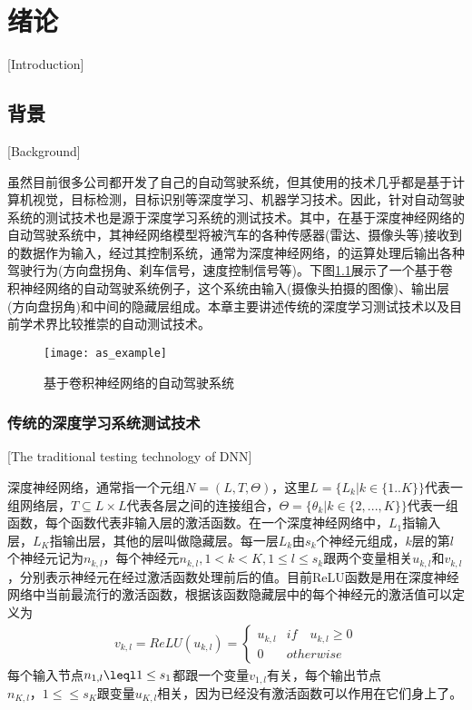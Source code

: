 \newcommand{\specialcell}[2][c]{%
  \begin{tabular}[#1]{@{}c@{}}#2\end{tabular}}
\newcommand{\mthead}[1]{\textit{\textbf{#1}}}

\newcommand{\newmodel}[1]{\textbf{#1.}\cite{#1}\quad}

\chapter{绪论}[Introduction]

\section{背景}[Background]

虽然目前很多公司都开发了自己的自动驾驶系统，但其使用的技术几乎都是基于计算机视觉，目标检测，目标识别等深度学习、机器学习技术。因此，针对自动驾驶系统的测试技术也是源于深度学习系统的测试技术。其中，在基于深度神经网络的自动驾驶系统中，其神经网络模型将被汽车的各种传感器(雷达、摄像头等)接收到的数据作为输入，经过其控制系统，通常为深度神经网络，的运算处理后输出各种驾驶行为(方向盘拐角、刹车信号，速度控制信号等)。下图\ref{as_example}展示了一个基于卷积神经网络的自动驾驶系统例子，这个系统由输入(摄像头拍摄的图像)、输出层(方向盘拐角)和中间的隐藏层组成。本章主要讲述传统的深度学习测试技术以及目前学术界比较推崇的自动测试技术。

\begin{figure}[h]
    \centering
    \texttt{[image: as\_example]}
    \caption{基于卷积神经网络的自动驾驶系统\cite{DeepRoad}}
    \label{as_example}
\end{figure}

\subsection{传统的深度学习系统测试技术}[The traditional testing technology of DNN]

深度神经网络，通常指一个元组$N=(L,T,\Theta)$，这里$L=\{L_k|k\in \{1..K\}\}$代表一组网络层，$T\subseteq L\times L$代表各层之间的连接组合，$\Theta=\{\theta_k|k\in \{2,...,K\}\}$代表一组函数，每个函数代表非输入层的激活函数。在一个深度神经网络中，$L_1$指输入层，$L_K$指输出层，其他的层叫做隐藏层。每一层$L_k$由$s_k$个神经元组成，$k$层的第$l$个神经元记为$n_{k,l}$，每个神经元$n_{k,l},1\lt k \lt K, 1\leq l\leq s_k$跟两个变量相关$u_{k,l}$和$v_{k,l}$，分别表示神经元在经过激活函数处理前后的值。目前ReLU\cite{relu}函数是用在深度神经网络中当前最流行的激活函数，根据该函数隐藏层中的每个神经元的激活值可以定义为
\begin{gather}
    v_{k,l}=ReLU(u_{k,l})=\begin{cases}
        u_{k,l} & if\quad u_{k,l} \geq 0 \\
        0 & otherwise
    \end{cases}
\end{gather}
每个输入节点$n_{1,l}\leql 1 \leq s_1$都跟一个变量$v_{1,l}$有关，每个输出节点$n_{K,l}，1\leq \leq s_K$跟变量$u_{K,l}$相关，因为已经没有激活函数可以作用在它们身上了。

